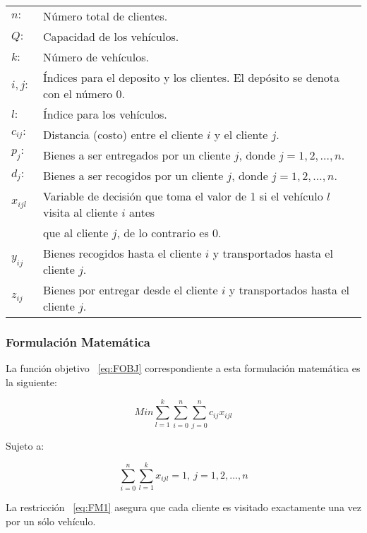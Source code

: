 \begin{tabular}{ll}
{$n:\,$} 		& {Número total de clientes.}  \\ 
{$Q:\,$} 		& {Capacidad de los vehículos.} \\ 
{$k:\,$}  		& {Número de vehículos.}\\
{$i,j:\,$}		& {Índices para el deposito y los clientes. El depósito se denota con el número 0.}\\
{$l:\,$}    	& {Índice para los vehículos.}\\
{$c_{ij}:\,$} 	& {Distancia (costo) entre el cliente $i$ y el cliente $j$.}\\
{$p_j:\,$}		& {Bienes a ser entregados por un cliente $j$, donde $j=1,2,…,n$.}	\\	
{$d_j:\,$}		& {Bienes a ser recogidos por un cliente $j$, donde $j=1,2,…,n$.} \\
{$x_{ijl}$} 	& {Variable de decisión que toma el valor de 1 si el vehículo $l$ visita al cliente $i$ antes } \\
{$ $}              & {que al cliente $j$, de lo contrario es 0.} \\
{$y_{ij}$} 		& {Bienes recogidos hasta el cliente $i$ y transportados hasta el cliente $j$.} \\
{$z_{ij}$}		& {Bienes por entregar desde el cliente $i$ y transportados hasta el cliente $j$.}\\

\end{tabular} 

\subsubsection{Formulación Matemática}

La función objetivo ~\eqref{eq:FOBJ} correspondiente a esta formulación matemática es la siguiente: 


\begin{equation}\label{eq:FOBJ}
 Min \sum_{l=1}^k\sum_{i=0}^n\sum_{j=0}^n  c_{ij} x_{ijl} 
\end{equation}

Sujeto a:

\begin{equation}\label{eq:FM1}
\sum_{i=0}^n \sum_{l=1}^k x_{ijl}=1 , \: j=1,2,…,n 
\end{equation}


	La restricción ~\eqref{eq:FM1} asegura que cada cliente es visitado exactamente una vez por un sólo vehículo.


